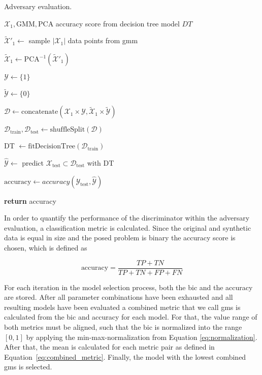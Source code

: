 \documentclass[../../main.tex]{subfiles}
\begin{document}
\begin{algorithm}
    \caption[Adversary evaluation]{Adversary evaluation.}
    \label{alg:adversary_evaluation}
    \begin{algorithmic}[1]
        \REQUIRE $\mathcal{X}_1, \text{GMM}, \text{PCA}$
        \ENSURE accuracy score from decision tree model $DT$

        \STATE $\tilde{\mathcal{X}}'_1 \leftarrow$ sample $|\mathcal{X}_1|$ data points from \gls{gmm}

        \STATE $\tilde{\mathcal{X}}_1 \leftarrow \text{PCA}^{-1}(\tilde{\mathcal{X}}'_1)$ 

        \STATE $\mathcal{Y} \leftarrow \{ 1 \}$
        
        \STATE $\tilde{\mathcal{Y}} \leftarrow \{ 0 \}$

        \STATE $\mathcal{D} \leftarrow \text{concatenate}(\mathcal{X}_1 \times \mathcal{Y}, \tilde{\mathcal{X}}_1 \times \tilde{\mathcal{Y}})$
        
        \STATE $\mathcal{D}_{\text{train}}, \mathcal{D}_{\text{test}} \leftarrow \text{shuffleSplit}(\mathcal{D})$

        \STATE DT $\leftarrow \text{fitDecisionTree}(\mathcal{D}_{\text{train}})$

        \STATE $\hat{\mathcal{Y}} \leftarrow$ predict $\mathcal{X}_{\text{test}} \subset \mathcal{D}_{\text{test}}$ with DT

        \STATE $\text{accuracy} \leftarrow accuracy(\mathcal{Y}_{\text{test}}, \hat{\mathcal{Y}})$

        \STATE \textbf{return} accuracy
    \end{algorithmic}
 \end{algorithm}

In order to quantify the performance of the discriminator within the adversary evaluation, a classification metric is calculated. Since the original and synthetic data is equal in size and the posed problem is binary the accuracy score is chosen, which is defined as

 \begin{equation}
    \text{accuracy} = \frac{TP + TN}{TP + TN + FP + FN}
 \end{equation}

 For each iteration in the model selection process, both the \gls{bic} and the accuracy are stored. After all parameter combinations have been exhausted and all resulting models have been evaluated a combined metric that we call  \acrfull{gms} is calculated from the \gls{bic} and accuracy for each model. For that, the value range of both metrics must be aligned, such that the \gls{bic} is normalized into the range $[0, 1]$ by applying the min-max-normalization from Equation \ref{eq:normalization}. After that, the mean is calculated for each metric pair as defined in Equation~\ref{eq:combined_metric}. Finally, the model with the lowest combined \gls{gms} is selected. 
 
\end{document}
